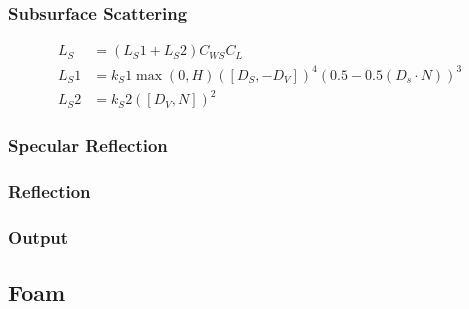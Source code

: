 \subsubsection{Subsurface Scattering}
\begin{equation}
    \begin{split}
        L_S &= (L_S1 + L_S2) C_{WS} C_L\\
        L_S1 &= k_S1 \max(0, H) ([D_S, -D_V])^{4}(0.5-0.5(D_s \cdot N))^{3}\\
        L_S2 &= k_S2 ([D_V, N])^{2}
    \end{split}
\end{equation}

\subsubsection{Specular Reflection}

\subsubsection{Reflection}

\subsubsection{Output}

\subsection{Foam}



